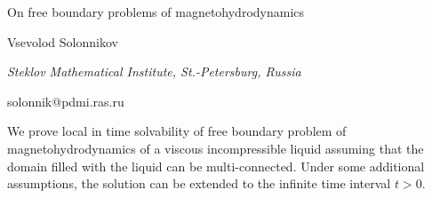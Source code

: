 \documentclass[10pt,a4paper]{article}
\begin{document}
\begin{center}

{\Large On free boundary problems of magnetohydrodynamics}

\bigskip

{\sc Vsevolod Solonnikov}

{\small\it Steklov Mathematical Institute, St.-Petersburg, Russia}

{\small\rm solonnik@pdmi.ras.ru}

\end{center}

\bigskip

We prove  local in time solvability of free boundary problem of
magnetohydrodynamics of a viscous incompressible liquid assuming that
the domain filled with the liquid can be multi-connected.
Under some additional assumptions, the solution can be extended to the
infinite time interval $t>0$.
\end{document}
